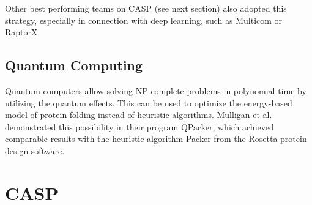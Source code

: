 Other best performing teams on CASP (see next section) also adopted this strategy, especially in connection with deep learning, such as Multicom \cite{multicom} or RaptorX \cite{raptorx}

\subsection{Quantum Computing}
Quantum computers allow solving NP-complete problems in polynomial time by utilizing the quantum effects.
This can be used to optimize the energy-based model of protein folding instead of heuristic algorithms.
Mulligan et al. \cite{mulligan2019designing} demonstrated this possibility in their program QPacker, which achieved comparable results with the heuristic algorithm Packer from the Rosetta protein design software.


\section{CASP}

